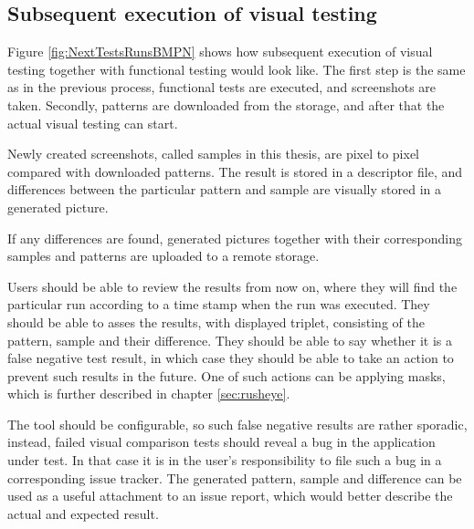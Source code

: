 \documentclass[11pt,oneside,final]{fithesis2}
\begin{document}
  \subsection{Subsequent execution of visual testing}
  
  Figure \ref{fig:NextTestsRunsBMPN} shows how subsequent execution of visual testing together with functional testing would look like. The first step is the same as in the previous process,
  functional tests are executed, and screenshots are taken. Secondly, patterns are downloaded from the storage, and after that the actual visual testing can start.
  
  Newly created screenshots, called samples in this thesis, are pixel to pixel compared with downloaded patterns. The result is stored in a descriptor file, and differences between the 
  particular pattern and sample are visually stored in a generated picture.
  
  If any differences are found, generated pictures together with their corresponding samples and patterns are uploaded to a remote storage.
  
  Users should be able to review the results from now on, where they will find the particular run according to a time stamp when the run was executed. They should be able to asses the results,
  with displayed triplet, consisting of the pattern, sample and their difference. They should be able to say whether it is a false negative test result, in which case they should be able to 
  take an action to prevent such results in the future. One of such actions can be applying masks, which is further described in chapter \ref{sec:rusheye}.
  
  The tool should be configurable, so such false negative results are rather sporadic, instead, failed visual comparison tests should reveal a bug in the application under test. In that case
  it is in the user's responsibility to file such a bug in a corresponding issue tracker. The generated pattern, sample and difference can be used as a useful attachment to an issue report, which
  would better describe the actual and expected result.
  
\end{document}
